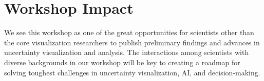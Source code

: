 \section {Workshop Impact}
We see this workshop as one of the great opportunities for scientists other than the core visualization researchers to publish preliminary findings and advances in uncertainty visualization and analysis. The interactions among scientists with diverse backgrounds  in our workshop will be key to creating a roadmap for solving toughest challenges in uncertainty visualization, AI, and decision-making.